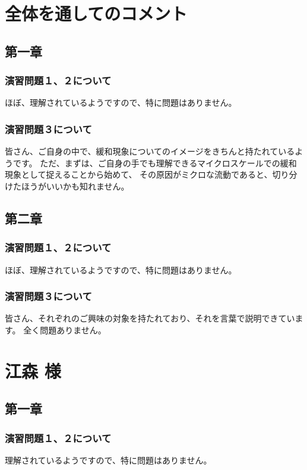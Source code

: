 \documentclass[uplatex,dvipdfmx,a4paper,11pt]{jsreport}
\begin{document}
\section*{全体を通してのコメント}
\subsection*{第一章}
\subsubsection*{演習問題１、２について}
ほぼ、理解されているようですので、特に問題はありません。

\subsubsection*{演習問題３について}

皆さん、ご自身の中で、緩和現象についてのイメージをきちんと持たれているようです。
ただ、まずは、ご自身の手でも理解できるマイクロスケールでの緩和現象として捉えることから始めて、
その原因がミクロな流動であると、切り分けたほうがいいかも知れません。

\subsection*{第二章}
\subsubsection*{演習問題１、２について}
ほぼ、理解されているようですので、特に問題はありません。



\subsubsection*{演習問題３について}

皆さん、それぞれのご興味の対象を持たれており、それを言葉で説明できています。
全く問題ありません。



\clearpage

\section*{江森 様}
\subsection*{第一章}
\subsubsection*{演習問題１、２について}
理解されているようですので、特に問題はありません。
\end{document}
